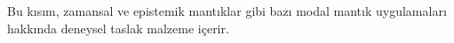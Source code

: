 


\begin{editorial}
Bu kısım, zamansal ve epistemik mantıklar gibi bazı modal mantık uygulamaları
hakkında deneysel taslak malzeme içerir.
\end{editorial}



\OLEndPartHook

